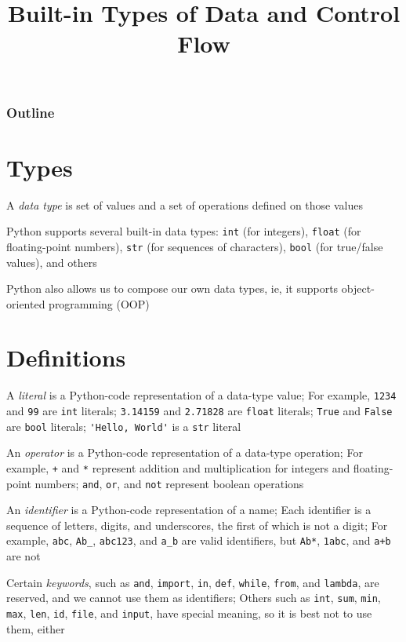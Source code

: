 \documentclass[8pt,a4paper,compress]{beamer}
\title{Built-in Types of Data and Control Flow}
\date{}
\begin{document}
\begin{frame}
\vfill
\titlepage
\end{frame}

\begin{frame}
\frametitle{Outline}
\tableofcontents
\end{frame}

\section{Types}
\begin{frame}[fragile]
A \emph{data type} is set of values and a set of operations defined on those values

\bigskip

Python supports several built-in data types: \lstinline{int} (for integers), \lstinline{float} (for floating-point numbers), \lstinline{str} (for sequences of characters), \lstinline{bool} (for true/false values), and others

\bigskip

Python also allows us to compose our own data types, ie, it supports object-oriented programming (OOP)
\end{frame}

\section{Definitions}
\begin{frame}[fragile]
A \emph{literal} is a Python-code representation of a data-type value;  For example, \lstinline{1234} and \lstinline{99} are \lstinline{int} literals; \lstinline{3.14159} and \lstinline{2.71828} are \lstinline{float} literals; \lstinline{True} and \lstinline{False} are \lstinline{bool} literals; \lstinline{'Hello, World'} is a \lstinline{str} literal

\bigskip

An \emph{operator} is a Python-code representation of a data-type operation; For example, \lstinline{+} and \lstinline{*} represent addition and multiplication for integers and floating-point numbers; \lstinline{and}, \lstinline{or}, and \lstinline{not} represent boolean operations

\bigskip

An \emph{identifier} is a Python-code representation of a name; Each identifier is a sequence of letters, digits, and underscores, the first of which is not a digit; For example, \lstinline{abc}, \lstinline{Ab_}, \lstinline{abc123}, and \lstinline{a_b} are valid identifiers, but \lstinline{Ab*}, \lstinline{1abc}, and \lstinline{a+b} are not

\bigskip

Certain \emph{keywords}, such as \lstinline{and}, \lstinline{import}, \lstinline{in}, \lstinline{def}, \lstinline{while}, \lstinline{from}, and \lstinline{lambda}, are reserved, and we cannot use them as identifiers; Others such as \lstinline{int}, \lstinline{sum}, \lstinline{min}, \lstinline{max}, \lstinline{len}, \lstinline{id}, \lstinline{file}, and \lstinline{input}, have special meaning, so it is best not to use them, either
\end{frame}
\end{document}
